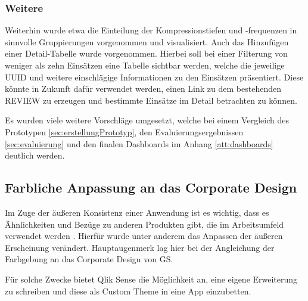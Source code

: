 \subsubsection{Weitere}
Weiterhin wurde etwa die Einteilung der Kompressionstiefen und -frequenzen in sinnvolle Gruppierungen vorgenommen und visualisiert.
\label{par:DetailTabelle}
Auch das Hinzufügen einer \glqq Detail-Tabelle\grqq{} wurde vorgenommen.
Hierbei soll bei einer Filterung von weniger als zehn Einsätzen eine Tabelle sichtbar werden, welche die jeweilige UUID und weitere einschlägige Informationen zu den Einsätzen präsentiert.
Diese könnte in Zukunft dafür verwendet werden, einen Link zu dem bestehenden \gls{REVIEW} zu erzeugen und bestimmte Einsätze im Detail betrachten zu können.

Es wurden viele weitere Vorschläge umgesetzt, welche bei einem Vergleich des Prototypen \ref{sec:erstellungPrototyp}, den Evaluierungsergebnissen \ref{sec:evaluierung} und den finalen Dashboards im Anhang \ref{att:dashboards} deutlich werden.

\subsection{Farbliche Anpassung an das Corporate Design}
Im Zuge der äußeren Konsistenz einer Anwendung ist es wichtig, dass es Ähnlichkeiten und Bezüge zu anderen Produkten gibt, die im Arbeitsumfeld verwendet werden \cite{Christoforakos.2017, Abele.2007}.
Hierfür wurde unter anderem das Anpassen der äußeren Erscheinung verändert.
Hauptaugenmerk lag hier bei der Angleichung der Farbgebung an das Corporate Design von \gls{GS}.

Für solche Zwecke bietet Qlik Sense die Möglichkeit an, eine eigene Erweiterung zu schreiben und diese als \glqq Custom Theme\grqq{} in eine App einzubetten.


